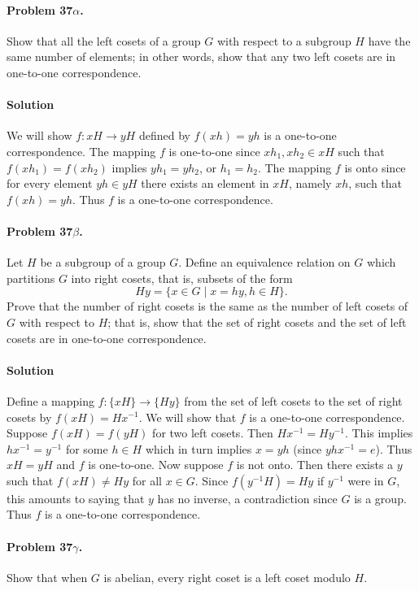 \paragraph{Problem 37$\alpha$.}
Show that all the left cosets of a group $G$ with respect to a subgroup $H$
have the same number of elements; in other words, show that any two left cosets
are in one-to-one correspondence.

\paragraph*{Solution}
We will show $f : xH \rightarrow yH$ defined by $f (xh) = yh$ is a one-to-one
correspondence. The mapping $f$ is one-to-one since $xh_1, xh_2 \in xH$ such that
$f(xh_1)= f(xh_2) $ implies $yh_1 = yh_2$, or $h_1 = h_2$. The mapping $f$ is onto
since for every element $yh \in yH$ there exists an element in $xH$, namely $xh$,
such that $f (xh) = yh$. Thus $f$ is a one-to-one correspondence.

\paragraph{Problem 37$\beta$.}
Let $H$ be a subgroup of a group $G$. Define an equivalence relation on $G$
which partitions $G$ into right cosets, that is, subsets of the form
$$Hy = \{ x \in G \mid x = h y, h \in H \}. $$
Prove that the number of right cosets is the same as the number of left cosets
of $G$ with respect to $H$; that is, show that the set of right cosets and the
set of left cosets are in one-to-one correspondence.

\paragraph*{Solution}
Define a mapping $f : \{ xH \} \rightarrow \{Hy\}$ from the set of left cosets
to the set of right cosets by $f (xH) = Hx^{-1}$. We will show that $f$ is a
one-to-one correspondence. Suppose $f(xH) = f(yH)$ for two left cosets. Then
$Hx^{-1} = Hy^{-1}$. This implies $hx^{-1} = y^{-1}$ for some $h \in H$ which
in turn implies $x = yh$ (since $yhx^{-1} = e$). Thus $xH = yH$ and $f$ is
one-to-one. Now suppose $f$ is not onto. Then there exists a $y$ such that
$f(xH) \neq Hy$ for all $x \in G$. Since $f(y^{-1}H) = Hy$ if $y^{-1}$ were in $G$,
this amounts to saying that $y$ has no inverse, a contradiction since $G$ is a
group. Thus $f$ is a one-to-one correspondence.

\paragraph{Problem 37$\gamma$.}
Show that when $G$ is abelian, every right coset is a left coset modulo $H$.

